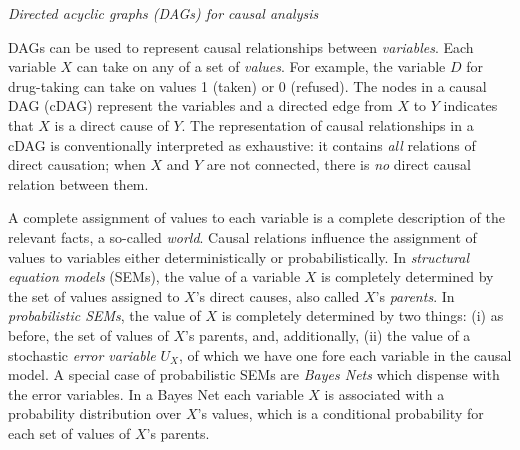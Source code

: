 \documentclass[nobib]{tufte-handout}
\begin{document}
\begin{InfoBox}
\centering
 \colorbox{mygray}{
    \begin{minipage}{1\textwidth}
    \medskip
    \emph{Directed acyclic graphs (DAGs) for causal analysis}
    \medskip

    DAGs can be used to represent causal relationships between \textit{variables}.
    Each variable $X$ can take on any of a set of \textit{values}.
    For example, the variable $D$ for drug-taking can take on values 1 (taken) or 0 (refused).
    The nodes in a causal DAG (cDAG) represent the variables and a directed edge from $X$ to $Y$ indicates that $X$ is a direct cause of $Y$.
    The representation of causal relationships in a cDAG is conventionally interpreted as exhaustive: it contains \textit{all} relations of direct causation; when $X$ and $Y$ are not connected, there is \textit{no} direct causal relation between them.



    A complete assignment of values to each variable is a complete description of the relevant facts, a so-called \textit{world}.
    Causal relations influence the assignment of values to variables either deterministically or probabilistically.
    In \textit{structural equation models} (SEMs), the value of a variable $X$ is completely determined by the set of values assigned to $X$'s direct causes, also called $X$'s \textit{parents}.
    In \textit{probabilistic SEMs}, the value of $X$ is completely determined by two things: (i) as before, the set of values of $X$'s parents, and, additionally, (ii) the value of a stochastic \emph{error variable} $U_{X}$, of which we have one fore each variable in the causal model.
    A special case of probabilistic SEMs are \textit{Bayes Nets} which dispense with the error variables.
    In a Bayes Net each variable $X$ is associated with a probability distribution over $X$'s values, which is a conditional probability for each set of values of $X$'s parents.


\end{minipage}}
\end{InfoBox}
\end{document}
